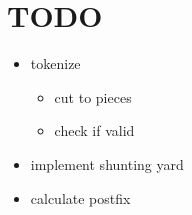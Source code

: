 \documentclass[12pt]{article}
\begin{document}
	\section*{TODO}
	\begin{itemize}
		\item tokenize
			\begin{itemize}
				\item cut to pieces
				\item check if valid
			\end{itemize}
		\item implement shunting yard
		\item calculate postfix
	\end{itemize}
\end{document}
